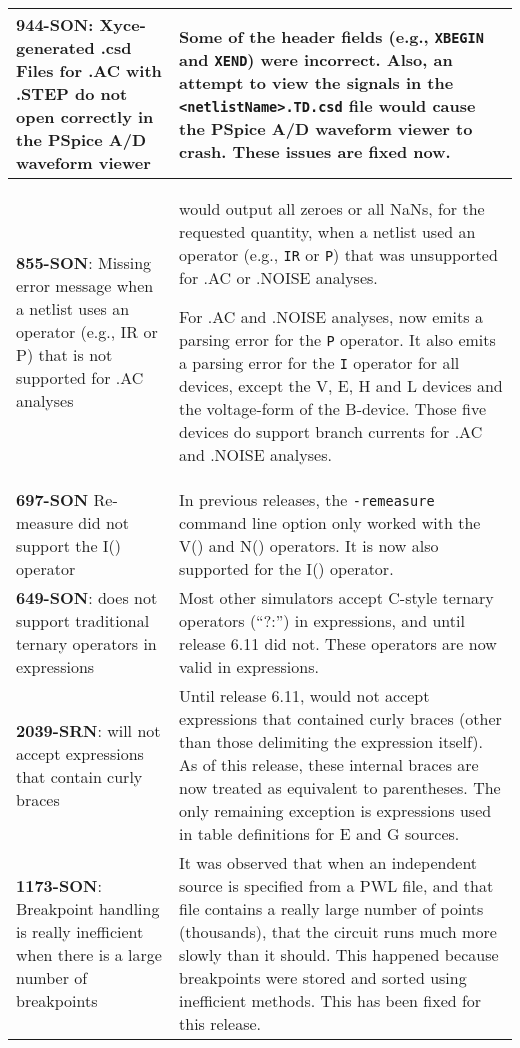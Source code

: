 {\begin{longtable}[h] {>{\raggedright\small}m{2in}|>{\raggedright\let\\\tabularnewline\small}m{3.5in}}
\textbf{944-SON}: Xyce-generated .csd Files for .AC with .STEP do not 
open correctly in the PSpice A/D waveform viewer &  Some of the header 
fields (e.g., \texttt{XBEGIN} and \texttt{XEND}) were incorrect.  Also, an 
attempt to view the signals in the \texttt{<netlistName>.TD.csd} file would 
cause the PSpice A/D waveform viewer to crash.  These issues are fixed now.  
\\ \hline

\textbf{855-SON}: Missing error message when a netlist uses an operator (e.g.,
IR or P) that is not supported for .AC analyses &  \Xyce{} would output all
zeroes or all NaNs, for the requested quantity, when a netlist used an operator (e.g.,
\texttt{IR} or \texttt{P}) that was unsupported for .AC or .NOISE analyses.

For .AC and .NOISE analyses,  \Xyce{} now emits a parsing error for the \texttt{P}
operator.  It also emits a parsing error for the \texttt{I} operator for all devices,
except the V, E, H and L devices and the voltage-form of the B-device.  Those five
devices do support branch currents for .AC and .NOISE analyses. \\ \hline

\textbf{697-SON} Re-measure did not support the  I() operator & In previous \Xyce{} 
releases, the \texttt{-remeasure} command line option only worked with the V() 
and N() operators.  It is now also supported for the I() operator. \\ \hline 

\textbf{649-SON}: \Xyce{} does not support traditional ternary operators in expressions &
 Most other simulators accept C-style ternary operators (``?:'') in
 expressions, and until release 6.11 \Xyce{} did not.  These operators
 are now valid in \Xyce{} expressions. \\ \hline

\textbf{2039-SRN}: \Xyce{} will not accept expressions that contain curly braces &
  Until release 6.11, \Xyce{} would not accept expressions that
  contained curly braces (other than those delimiting the expression
  itself).  As of this release, these internal braces are now treated
  as equivalent to parentheses.  The only remaining exception is expressions
  used in table definitions for E and G sources.\\ \hline


\textbf{1173-SON}: Breakpoint handling is really inefficient when there is a large number of breakpoints &  It was observed that when an independent source is specified from a PWL file, and that file contains a really large number of points (thousands), that the circuit runs much more slowly than it should.  This happened because breakpoints were stored and sorted using inefficient methods.  This has been fixed for this release.  \\ \hline


\end{longtable}}
